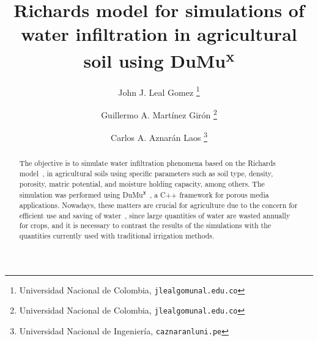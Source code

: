 \documentclass[a4paper,abstract=true]{scrartcl}
\date{}
\title{Richards model for simulations of water infiltration in agricultural soil using DuMu\textsuperscript{x}}
\author{John J. Leal Gomez
	\thanks{
		Universidad Nacional de Colombia,
		\texttt{jlealgom\MVAt unal.edu.co}}
    \and Guillermo A. Martínez Girón
    \thanks{
    Universidad Nacional de Colombia,
		\texttt{jlealgom\MVAt unal.edu.co}}
    \and Carlos A. Aznarán Laos
    \thanks{
      Universidad Nacional de Ingeniería,
		\texttt{caznaranl\MVAt uni.pe}}
}
\begin{document}
\maketitle

\begin{abstract}
	The objective is to simulate water infiltration phenomena based on
	the Richards model~\cite{richards_capillary_1931}, in agricultural
	soils using specific parameters such as soil type, density,
	porosity, matric potential, and moisture holding capacity, among
	others.
	The simulation was performed using
	DuMu\textsuperscript{x}~\cite{Kochetal2020Dumux}, a C++ framework
	for porous media applications.
	Nowadays, these matters are crucial for agriculture due to the
	concern for efficient use and saving of water~\cite{colombia_2021},
	since large quantities of water are wasted annually for crops, and
	it is necessary to contrast the results of the simulations with the
	quantities currently used with traditional irrigation methods.
\end{abstract}


\end{document}
